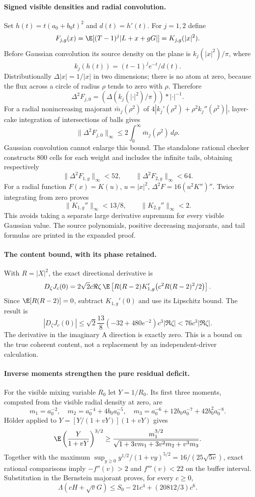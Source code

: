 \paragraph{Signed visible densities and radial convolution.}
Set $h(t)=t(a_0+b_0t)^2$ and $d(t)=h'(t)$. For $j=1,2$ define
\[
 F_{j,g}(x)=\E[(T-1)^j|L+x+gG|]=K_{j,g}(|x|^2).
\]
Before Gaussian convolution its source density on the plane is
$k_j(|x|^2)/\pi$, where
\[
 k_j(h(t))=(t-1)^j e^{-t}/d(t).
\]
Distributionally $\Delta|x|=1/|x|$ in two dimensions; there is no atom
at zero, because the flux across a circle of radius $\rho$ tends to
zero with $\rho$. Therefore
\[
 \Delta^2F_{j,0}=(\Delta(k_j(|\cdot|^2)/\pi))*|\cdot|^{-1}.
\]
For a radial nonincreasing majorant $\bar m_j(\rho^2)$ of
$4|k_j'(\rho^2)+\rho^2k_j''(\rho^2)|$, layer-cake integration of
intersections of balls gives
\[
 \|\Delta^2F_{j,0}\|_\infty
 \le2\int_0^\infty\bar m_j(\rho^2)\,d\rho.
\]
Gaussian convolution cannot enlarge this bound. The standalone
rational checker constructs 800 cells for each weight and includes
the infinite tails, obtaining respectively
\[
 \|\Delta^2F_{1,g}\|_\infty<52,\qquad
 \|\Delta^2F_{2,g}\|_\infty<64.
\]
For a radial function $F(x)=K(u)$, $u=|x|^2$,
$\Delta^2F=16(u^2K'')''$. Twice integrating from zero proves
\[
 \|K_{1,g}''\|_\infty<13/8,\qquad
 \|K_{2,g}''\|_\infty<2.
\]
This avoids taking a separate large derivative supremum for every
visible Gaussian value. The source polynomials, positive decreasing
majorants, and tail formulas are printed in the expanded proof.

\paragraph{The content bound, with its phase retained.}
With $R=|X|^2$, the exact directional derivative is
\[
 D_\zeta J_c(0)
 =2\sqrt2 c\Re\zeta\,
   \E\left[R(R-2)K_{1,g}'\bigl(c^2R(R-2)^2/2\bigr)\right].
\]
Since $\E[R(R-2)]=0$, subtract $K_{1,g}'(0)$ and use its Lipschitz
bound. The result is
\[
 |D_\zeta J_c(0)|
 \le \sqrt2\frac{13}{8}(-32+480e^{-2})c^3|\Re\zeta|
 <76c^3|\Re\zeta|.
\]
The derivative in the imaginary A direction is exactly zero. This is
a bound on the true coherent content, not a replacement by an
independent-driver calculation.

\paragraph{Inverse moments strengthen the pure residual deficit.}
For the visible mixing variable $R_0$ let $Y=1/R_0$. Its first three
moments, computed from the visible radial density at zero, are
\[
 m_1=a_0^{-2},\quad m_2=a_0^{-4}+4b_0a_0^{-5},\quad
 m_3=a_0^{-6}+12b_0a_0^{-7}+42b_0^2a_0^{-8}.
\]
H\"older applied to $Y=[Y/(1+vY)](1+vY)$ gives
\[
 \E\left(\frac{Y}{1+vY}\right)^{3/2}
 \ge\frac{m_1^{3/2}}{\sqrt{1+3vm_1+3v^2m_2+v^3m_3}}.
\]
Together with the maximum
$\sup_{y\ge0}y^{1/2}/(1+vy)^{5/2}=16/(25\sqrt{5v})$,
exact rational comparisons imply $-f''(v)>2$ and $f'''(v)<22$ on
the buffer interval. Substitution in the Bernstein majorant proves,
for every $c\ge0$,
\[
 \Lambda(cH+\sqrt vG)\le S_0-21c^4+(20812/3)c^6.
\]

